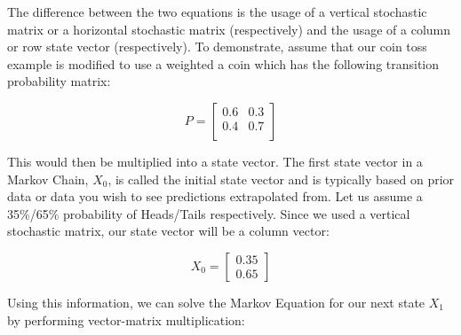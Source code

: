 \documentclass[12pt,final]{article}
\begin{document}
The difference between the two equations is the usage of a vertical stochastic matrix or a
horizontal stochastic matrix (respectively) and the usage of a column or row state vector
(respectively). To demonstrate, assume that our coin toss example is modified to use a weighted
a coin which has the following transition probability matrix:

\begin{equation}
  P=\begin{bmatrix}
    0.6 & 0.3 \\
    0.4 & 0.7 \\
  \end{bmatrix}
  \label{eq:transitionprobabilitymatrixweightedcointoss}
\end{equation}

This would then be multiplied into a state vector. The first state vector in a Markov Chain, $X_0$,
is called the initial state vector and is typically based on prior data or data you wish to see
predictions extrapolated from. Let us assume a 35\%/65\% probability of Heads/Tails respectively.
Since we used a vertical stochastic matrix, our state vector will be a column vector:

\begin{equation}
  X_0=\begin{bmatrix}
    0.35 \\
    0.65
  \end{bmatrix}
  \label{eq:initialstatevectorweightedcointoss}
\end{equation}

Using this information, we can solve the Markov Equation for our next state $X_1$ by performing
vector-matrix multiplication:
\end{document}
